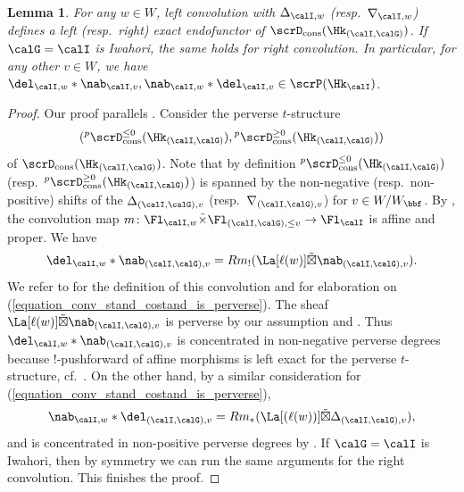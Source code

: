 \documentclass[10pt, reqno]{amsart}
\theoremstyle{plain}
\newtheorem{lemma}[theorem]{Lemma}
\theoremstyle{definition}
\numberwithin{equation}{section}
\begin{document}
	\begin{lemma}\label{Lemma_standatnd_convo_costand}
		\label{fn:1-convolution-of-standard-costandard-objects-perverse}
		For any $w \in W$, left convolution with $\Delta_{\calI,w} $ (resp.~$\nabla_{\calI,w} $) defines a left (resp.~right) exact endofunctor of $\scrD_\mathrm{cons}(\Hk_{(\calI,\calG)})$. If $\calG=\calI$ is Iwahori, the same holds for right convolution. In particular, for any other $v\in W$, we have $\del_{\calI,w}*\nab_{\calI,v}, \nab_{\calI,w}*\del_{\calI,v}\in \scrP(\Hk_\calI)$.
	\end{lemma}
	\begin{proof}
		Our proof parallels \cite[Lemma 4.1.7]{AR}. Consider the perverse $t$-structure 
		$$
		({}^p\scrD_{\mathrm{cons}}^{\leq 0}(\Hk_{(\calI,\calG)}),{}^p\scrD_{\mathrm{cons}}^{\geq 0}(\Hk_{(\calI,\calG)}) )
		$$ of $\scrD_{\mathrm{cons}}(\Hk_{(\calI,\calG)})$.
		Note that by definition ${}^p\scrD_{\mathrm{cons}}^{\leq 0}(\Hk_{(\calI,\calG)}) $ (resp.~${}^p\scrD_{\mathrm{cons}}^{\geq 0}(\Hk_{(\calI,\calG)}) $) is spanned by the non-negative (resp.~non-positive) shifts of the $\Delta_{(\calI,\calG),v}$ (resp.~$\nabla_{(\calI,\calG),v}$) for $v \in W/W_\bbf$. By , the convolution map $m\colon \Fl_{\calI,w}\tilde{\times}\Fl_{(\calI,\calG),\leq v}\rightarrow \Fl_\calI$ is affine and proper. We have 
		\begin{equation}\label{equation_conv_stand_costand_is_perverse}
			\del_{\calI,w}\ast \nab_{(\calI,\calG),v}=Rm_!(\La[\ell(w)]\tilde{\boxtimes} \nab_{(\calI,\calG),v}).
		\end{equation}
		We refer to \cite[(2.2.2)]{AR} for the definition of this convolution and  \cite[Lemma 4.1.7]{AR} for elaboration on (\ref{equation_conv_stand_costand_is_perverse}). The sheaf $\La[\ell(w)]\tilde{\boxtimes} \nab_{(\calI,\calG),v}$ is perverse by our assumption and . Thus $\del_{\calI,w}\ast \nab_{(\calI,\calG),v}$ is concentrated in non-negative perverse degrees because $!$-pushforward of affine morphisms is left exact for the perverse $t$-structure, cf.\ \cite[Corollaire 4.1.2]{BBDG18}.
		On the other hand, by a similar consideration for (\ref{equation_conv_stand_costand_is_perverse}),
		\begin{equation}
			\nab_{\calI,w}\ast \del_{(\calI,\calG),v}=Rm_\ast(\La[(\ell(w))]\tilde{\boxtimes}\Delta_{(\calI,\calG),v}),
		\end{equation}
		and is concentrated in non-positive perverse degrees by \cite[Th\'eorème 4.1.1]{BBDG18}. If $\calG=\calI$ is Iwahori, then by symmetry we can run the same arguments for the right convolution. This finishes the proof.
	\end{proof}
	
\end{document}
